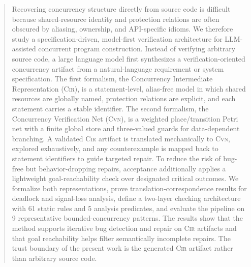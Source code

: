 \documentclass[sigconf]{acmart}
\begin{document}
\begin{abstract}
Recovering concurrency structure directly from source code is difficult because shared-resource identity and protection relations are often obscured by aliasing, ownership, and API-specific idioms. We therefore study a specification-driven, model-first verification architecture for LLM-assisted concurrent program construction. Instead of verifying arbitrary source code, a large language model first synthesizes a verification-oriented concurrency artifact from a natural-language requirement or system specification. The first formalism, the Concurrency Intermediate Representation (\textsc{Cir}), is a statement-level, alias-free model in which shared resources are globally named, protection relations are explicit, and each statement carries a stable identifier. The second formalism, the Concurrency Verification Net (\textsc{Cvn}), is a weighted place/transition Petri net with a finite global store and three-valued guards for data-dependent branching. A validated \textsc{Cir} artifact is translated mechanically to \textsc{Cvn}, explored exhaustively, and any counterexample is mapped back to statement identifiers to guide targeted repair. To reduce the risk of bug-free but behavior-dropping repairs, acceptance additionally applies a lightweight goal-reachability check over designated critical outcomes. We formalize both representations, prove translation-correspondence results for deadlock and signal-loss analysis, define a two-layer checking architecture with 61 static rules and 5 analysis predicates, and evaluate the pipeline on 9 representative bounded-concurrency patterns. The results show that the method supports iterative bug detection and repair on \textsc{Cir} artifacts and that goal reachability helps filter semantically incomplete repairs. The trust boundary of the present work is the generated \textsc{Cir} artifact rather than arbitrary source code.
\end{abstract}



\maketitle















\end{document}
